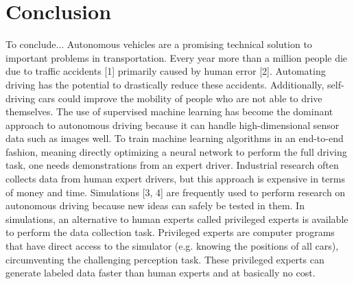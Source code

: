 \chapter{Conclusion}
\label{sec:conclusion}

To conclude...
Autonomous vehicles are a promising technical solution to important problems in
transportation. Every year more than a million people die due to traffic accidents
[1] primarily caused by human error [2]. Automating driving has the potential to
drastically reduce these accidents. Additionally, self-driving cars could improve
the mobility of people who are not able to drive themselves. The use of supervised
machine learning has become the dominant approach to autonomous driving because
it can handle high-dimensional sensor data such as images well. To train machine
learning algorithms in an end-to-end fashion, meaning directly optimizing a neural
network to perform the full driving task, one needs demonstrations from an expert
driver. Industrial research often collects data from human expert drivers, but this
approach is expensive in terms of money and time.
Simulations [3, 4] are frequently used to perform research on autonomous driving
because new ideas can safely be tested in them. In simulations, an alternative to
human experts called privileged experts is available to perform the data collection
task. Privileged experts are computer programs that have direct access to the
simulator (e.g. knowing the positions of all cars), circumventing the challenging
perception task. These privileged experts can generate labeled data faster than
human experts and at basically no cost.


